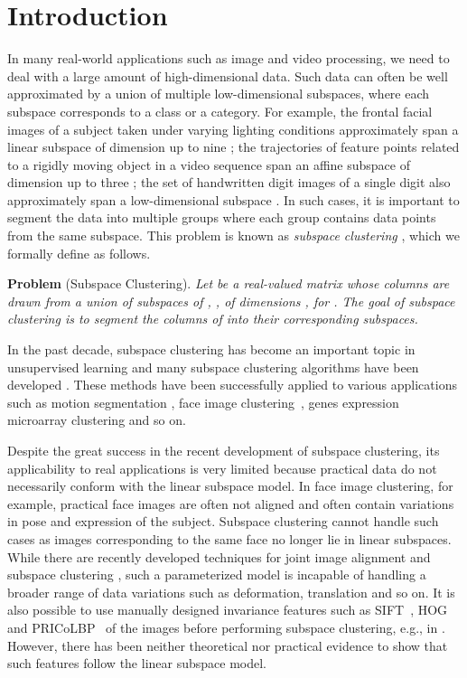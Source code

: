 \documentclass[10pt,twocolumn,letterpaper]{article}
\def\eg{e.g.}
\def\eg{e.g.}
\begin{document}
\section{Introduction}
\label{sec:intro}

In many real-world applications such as image and video processing, we need to deal with a large amount of high-dimensional data.
Such data can often be well approximated by a union of multiple low-dimensional subspaces, where each subspace corresponds to a class or a category. For example, the frontal facial images of a subject taken under varying lighting conditions approximately span a linear subspace of dimension up to nine \cite{Ho:CVPR03}; the trajectories of feature points related to a rigidly moving object in a video sequence span an affine subspace of dimension up to three \cite{CT:IJCV92}; the set of handwritten digit images of a single digit also approximately span a low-dimensional subspace \cite{Hastie:StatSci98}. In such cases, it is important to segment the data into multiple groups where each group contains data points from the same subspace. This problem is known as \textit{subspace clustering} \cite{ReVidal:ISM11,Vidal:Springer16}, which we formally define as follows.

{\textbf{Problem} (Subspace Clustering).} {\em Let  be a real-valued matrix whose columns are drawn from a union of  subspaces of , , of dimensions , for . The goal of subspace clustering is to segment the columns of  into their corresponding subspaces.}


In the past decade, subspace clustering has become an important topic in unsupervised learning and many subspace clustering algorithms have been developed \cite{Elham:CVPR09, Liu:ICML10, Favaro:CVPR11, Lu:ECCV12, Liu:TPAMI13, Lu:ICCV13-TraceLasso, Feng:CVPR14, Li:CVPR15, Peng:TCYB16, Zhang:VCIP16, You:CVPR16-EnSC, Li:TIP17}. These methods have been successfully applied to various applications such as motion segmentation \cite{Vidal:PAMI05, Rao:TPAMI10}, face image clustering~\cite{Elham:TPAMI13}, genes expression microarray clustering \cite{McWilliams:DMKD14, Li:ICPR18} and so on.

Despite the great success in the recent development of subspace clustering, its applicability to real applications is very limited because practical data do not necessarily conform with the linear subspace model.
In face image clustering, for example, practical face images are often not aligned and often contain variations in pose and expression of the subject.
Subspace clustering cannot handle such cases as images corresponding to the same face no longer lie in linear subspaces.
While there are recently developed techniques for joint image alignment and subspace clustering \cite{Li:PR16}, such a parameterized model is incapable of handling a broader range of data variations such as deformation, translation and so on.
It is also possible to use manually designed invariance features such as SIFT~\cite{Lowe:IJCV04}, HOG \cite{Dalal:CVPR05} and PRICoLBP~\cite{Qi:TPAMI14} of the images before performing subspace clustering, \eg, in \cite{Peng:IJCAI16, Peng:arxiv17}.
However, there has been neither theoretical nor practical evidence to show that such features follow the linear subspace model.
\end{document}

